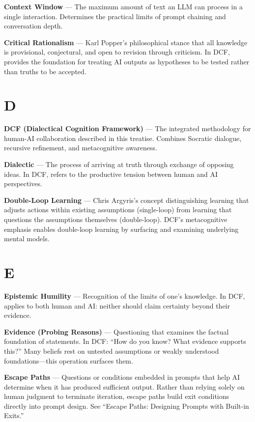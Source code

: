 \textbf{Context Window} --- The maximum amount of text an LLM can process in a single interaction. Determines the practical limits of prompt chaining and conversation depth.

\textbf{Critical Rationalism} --- Karl Popper's philosophical stance that all knowledge is provisional, conjectural, and open to revision through criticism. In DCF, provides the foundation for treating AI outputs as hypotheses to be tested rather than truths to be accepted.

\section*{D}

\textbf{DCF (Dialectical Cognition Framework)} --- The integrated methodology for human-AI collaboration described in this treatise. Combines Socratic dialogue, recursive refinement, and metacognitive awareness.

\textbf{Dialectic} --- The process of arriving at truth through exchange of opposing ideas. In DCF, refers to the productive tension between human and AI perspectives.

\textbf{Double-Loop Learning} --- Chris Argyris's concept distinguishing learning that adjusts actions within existing assumptions (single-loop) from learning that questions the assumptions themselves (double-loop). DCF's metacognitive emphasis enables double-loop learning by surfacing and examining underlying mental models.

\section*{E}

\textbf{Epistemic Humility} --- Recognition of the limits of one's knowledge. In DCF, applies to both human and AI: neither should claim certainty beyond their evidence.

\textbf{Evidence (Probing Reasons)} --- Questioning that examines the factual foundation of statements. In DCF: ``How do you know? What evidence supports this?'' Many beliefs rest on untested assumptions or weakly understood foundations---this operation surfaces them.

\textbf{Escape Paths} --- Questions or conditions embedded in prompts that help AI determine when it has produced sufficient output. Rather than relying solely on human judgment to terminate iteration, escape paths build exit conditions directly into prompt design. See ``Escape Paths: Designing Prompts with Built-in Exits.''

